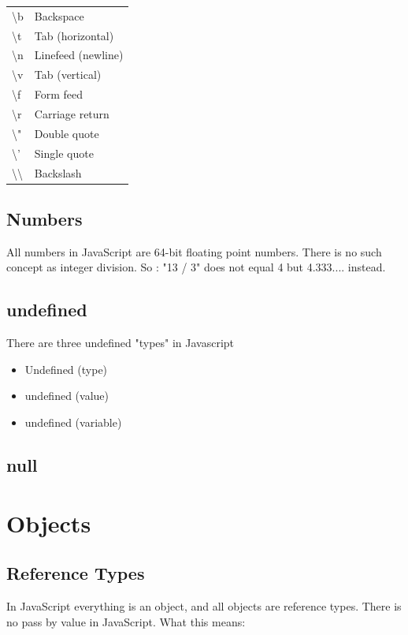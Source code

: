 \documentclass {amsart}
\begin{document}
			\begin{center}
			\begin{tabular} {| l |p{5cm}|}
			
				\textbackslash{b} & Backspace \\
				\textbackslash{t} & Tab (horizontal) \\
				\textbackslash{n} & Linefeed (newline) \\
				\textbackslash{v} & Tab (vertical) \\
				\textbackslash{f} & Form feed  \\
				\textbackslash{r} & Carriage return        \\
				\textbackslash{"} & Double quote           \\
				\textbackslash{'} & Single quote           \\
				\textbackslash{}\textbackslash{} & Backslash              \\

			\end{tabular}
			\end{center}
\subsection{Numbers}
	All numbers in JavaScript are 64-bit floating point numbers.  There is no such concept as integer division.  So :  "13 / 3" does not equal 4 but 4.333.... instead.

\subsection {undefined}
	There are three undefined "types" in Javascript 
	\begin{itemize}
		\item Undefined (type)
		\item undefined (value)
		\item undefined (variable)
	\end{itemize}


\subsection {null}


\section{Objects}
	\subsection {Reference Types}
		In JavaScript everything is an object, and all objects are reference types.  There is no pass by value in JavaScript.  
		What this means: 
	
\end{document}
